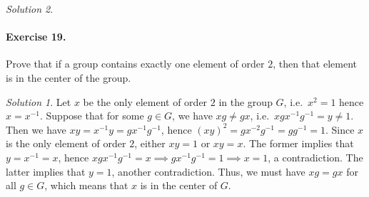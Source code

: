 \documentclass[11pt]{report}
\theoremstyle{remark}
\newtheorem*{solution}{Solution}
\begin{document}
\begin{solution}
    \paragraph{Exercise 19.} Prove that if a group contains exactly one element of
    order $2$, then that element is in the center of the group.
    \begin{solution}
        Let $x$ be the only element of order $2$ in the group $G$, i.e.\ $x^2 = 1$
        hence $x = x^{-1}$.
        Suppose that for some $g \in G$, we have $xg \neq gx$, i.e.\ $xgx^{-1}g^{-1}
        = y \neq 1$. Then we have $xy = x^{-1}y = gx^{-1}g^{-1}$, hence $(xy)^2 =
        gx^{-2}g^{-1} = gg^{-1} = 1$. Since $x$ is the only element of order $2$,
        either $xy = 1$ or $xy = x$. The former implies that $y = x^{-1} = x$, hence
        $xgx^{-1}g^{-1} = x \implies gx^{-1}g^{-1} = 1 \implies x = 1$, a
        contradiction. The latter implies that $y = 1$, another contradiction. Thus,
        we must have $xg = gx$ for all $g \in G$, which means that $x$ is in the
        center of $G$.
    \end{solution}
    

\end{solution}
\end{document}
